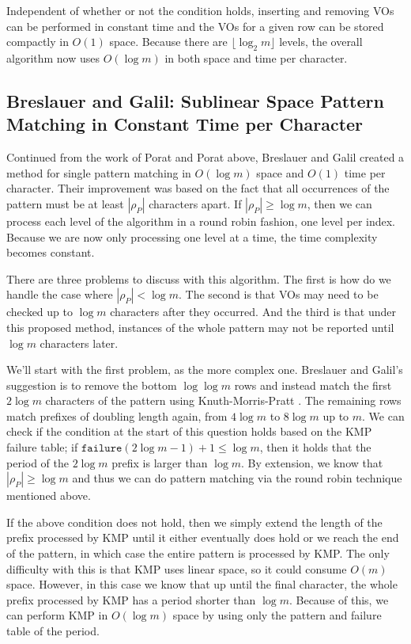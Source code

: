 \documentclass[ %
                    author={Dominic Joseph Moylett},
                    degree={MEng},
                     title={Dictionary Matching with Fingerprints},
                  subtitle={An Empirical Analysis},
                      type={research},
                      year={2015} ]{dissertation}
\begin{document}
Independent of whether or not the condition holds, inserting and removing VOs can be performed in constant time and the VOs for a given row can be stored compactly in $O(1)$ space. Because there are $\lfloor\log_2m\rfloor$ levels, the overall algorithm now uses $O(\log m)$ in both space and time per character.

\subsection{Breslauer and Galil: Sublinear Space Pattern Matching in Constant Time per Character}
\label{ssec:breslauer-galil}

Continued from the work of Porat and Porat above, Breslauer and Galil \cite{Breslauer:2014:RSS:2660854.2635814} created a method for single pattern matching in $O(\log m)$ space and $O(1)$ time per character. Their improvement was based on the fact that all occurrences of the pattern must be at least $|\rho_P|$ characters apart. If $|\rho_P| \geq \log m$, then we can process each level of the algorithm in a round robin fashion, one level per index. Because we are now only processing one level at a time, the time complexity becomes constant.

There are three problems to discuss with this algorithm. The first is how do we handle the case where $|\rho_P| < \log m$. The second is that VOs may need to be checked up to $\log m$ characters after they occurred. And the third is that under this proposed method, instances of the whole pattern may not be reported until $\log m$ characters later.

We'll start with the first problem, as the more complex one. Breslauer and Galil's suggestion is to remove the bottom $\log\log m$ rows and instead match the first $2\log m$ characters of the pattern using Knuth-Morris-Pratt \cite{kmp}. The remaining rows match prefixes of doubling length again, from $4\log m$ to $8\log m$ up to $m$. We can check if the condition at the start of this question holds based on the KMP failure table; if $\texttt{failure}(2\log m - 1) + 1 \leq \log m$, then it holds that the period of the $2\log m$ prefix is larger than $\log m$. By extension, we know that $|\rho_P| \geq \log m$ and thus we can do pattern matching via the round robin technique mentioned above.

If the above condition does not hold, then we simply extend the length of the prefix processed by KMP until it either eventually does hold or we reach the end of the pattern, in which case the entire pattern is processed by KMP. The only difficulty with this is that KMP uses linear space, so it could consume $O(m)$ space. However, in this case we know that up until the final character, the whole prefix processed by KMP has a period shorter than $\log m$. Because of this, we can perform KMP in $O(\log m)$ space by using only the pattern and failure table of the period.
\end{document}
